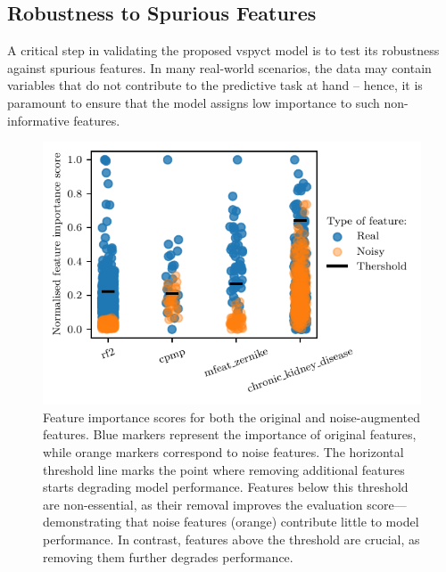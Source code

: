 \documentclass[3p,review,authoryear]{elsarticle}
\begin{document}
\subsection{Robustness to Spurious Features}%
\label{sec:noise_features}

A critical step in validating the proposed \gls{vspyct} model is to test its robustness against spurious features. 
In many real-world scenarios, the data may contain variables that do not contribute to the predictive task at hand -- hence, it is paramount to ensure that the model assigns low importance to such non-informative features. 

\begin{figure}[h!]
    \centering
    \includegraphics{../figures/feat_importances.pdf}
    \caption{Feature importance scores for both the original and noise-augmented features.
    Blue markers represent the importance of original features, while orange markers correspond to noise features. The horizontal threshold line marks the point where removing additional features starts degrading model performance. Features below this threshold are non-essential, as their removal improves the evaluation score—demonstrating that noise features (orange) contribute little to model performance. In contrast, features above the threshold are crucial, as removing them further degrades performance.}
    \label{fig:feature_importances}
\end{figure}
\end{document}
